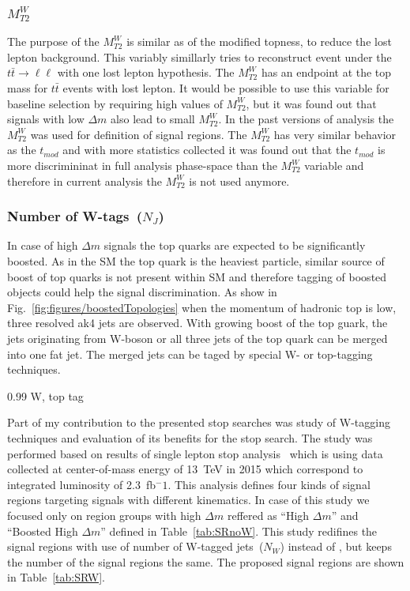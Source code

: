 \subsubsection{$M_{T2}^{W}$}

The purpose of the $M_{T2}^{W}$ is similar as of the modified topness, to reduce the lost lepton background. This variably simillarly tries to reconstruct event under the $t \bar{t} \to \ell \ell$ with one lost lepton hypothesis. The $M_{T2}^{W}$ has an endpoint at the top mass for $t\bar{t}$ events with lost lepton. It would be possible to use this variable for baseline selection by requiring high values of $M_{T2}^{W}$, but it was found out that signals with low $\Delta m$ also lead to small $M_{T2}^{W}$. In the past versions of analysis the $M_{T2}^{W}$ was used for definition of signal regions. The $M_{T2}^{W}$ has very similar behavior as the $t_{mod}$ and with more statistics collected it was found out that the $t_{mod}$ is more discrimininat in full analysis phase-space than the $M_{T2}^{W}$ variable and therefore in current analysis the $M_{T2}^{W}$ is not used anymore.


\subsubsection{Number of W-tags~($N_{J}$)}

In case of high  $\Delta m$ signals the top quarks are expected to be significantly boosted. As in the SM the top quark is the heaviest particle, similar source of boost of top quarks is not present within SM and therefore tagging of boosted objects could help the signal discrimination. As show in Fig.~\ref{fig:figures/boostedTopologies} when the momentum of hadronic top is low, three resolved ak4 jets are observed. With growing boost of the top guark, the jets originating from W-boson or all three jets of the top quark can be merged into one fat jet. The merged jets can be taged by special W- or top-tagging techniques.

                 {0.99}       %
                 { W, top tag }


Part of my contribution to the presented stop searches was study of W-tagging techniques and evaluation of its benefits for the stop search. The study was performed based on results of single lepton stop analysis~\cite{Sirunyan:2016jpr} which is using data collected at center-of-mass energy of 13~TeV in 2015 which correspond to integrated luminosity of 2.3~fb$^-1$. This analysis defines four kinds of signal regions targeting signals with different kinematics. In case of this study we focused only on region groups with high $\Delta m $ reffered as ``High $\Delta m$'' and ``Boosted High $\Delta m$'' defined in Table~\ref{tab:SRnoW}. This study redifines the signal regions with use of number of W-tagged jets~($N_{W}$) instead of \MET, but keeps the number of the signal regions the same. The proposed signal regions are shown in Table~\ref{tab:SRW}.

